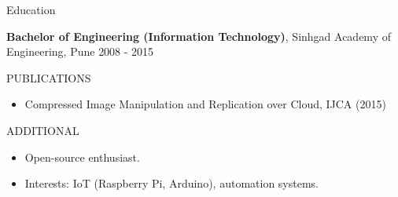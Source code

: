 \documentclass{resume} %
\begin{document}

\begin{rSection}{Education}

{\bf Bachelor of Engineering (Information Technology)}, Sinhgad Academy of Engineering, Pune \hfill {2008 - 2015}\\

\end{rSection}

\begin{rSection}{PUBLICATIONS} 
\begin{itemize}
    \item 	Compressed Image Manipulation and Replication over Cloud, IJCA (2015)
\end{itemize}


\end{rSection}

\begin{rSection}{ADDITIONAL} 
\begin{itemize}
    \item Open-source enthusiast.
    \item Interests: IoT (Raspberry Pi, Arduino), automation systems.
\end{itemize}


\end{rSection}
\end{document}
